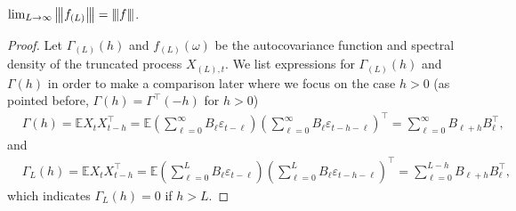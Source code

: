 \begin{lem}
\label{lemma:spectral_convergence}
$\lim_{L\rightarrow \infty}{\left\vert\kern-0.25ex\left\vert\kern-0.25ex\left\vert f_{(L)} \right\vert\kern-0.25ex\right\vert\kern-0.25ex\right\vert} = {\left\vert\kern-0.25ex\left\vert\kern-0.25ex\left\vert f \right\vert\kern-0.25ex\right\vert\kern-0.25ex\right\vert}$.
\begin{proof}
Let $\Gamma_{(L)}(h)$ and $f_{(L)}(\omega)$ be the autocovariance function and spectral density of the truncated process $X_{(L),t}$. 
We list expressions for $\Gamma_{(L)}(h)$
and $\Gamma(h)$ in order to make a comparison later where we focus on the case $h>0$ (as pointed before, $\Gamma(h) = \Gamma^\top(-h)$ for $h>0$)
\begin{equation}
\begin{aligned}
&\Gamma(h) = \mathbb{E} X_t X_{t-h}^\top = \mathbb{E}\left(\sum_{\ell=0}^\infty B_\ell \varepsilon_{t-\ell}\right) 
\left(\sum_{\ell=0}^\infty B_\ell \varepsilon_{t-h-\ell}\right)^\top = \sum_{\ell=0}^\infty B_{\ell+h}B_{\ell}^\top, \nonumber 
\end{aligned}
\end{equation}
and 
\begin{equation}
\begin{aligned}
&\Gamma_L(h) = \mathbb{E} X_t X_{t-h}^\top = \mathbb{E}\left(\sum_{\ell=0}^L B_\ell \varepsilon_{t-\ell}\right) 
\left(\sum_{\ell=0}^L B_\ell \varepsilon_{t-h-\ell}\right)^\top = \sum_{\ell=0}^{L-h} B_{\ell+h}B_{\ell}^\top, \nonumber 
\end{aligned}
\end{equation}
which indicates $\Gamma_L(h)= 0$ if $h>L$. \par 


\end{proof}
\end{lem}

